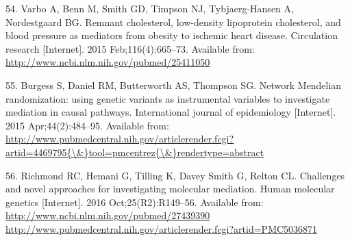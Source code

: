 \documentclass[]{article}
\begin{document}
\hypertarget{ref-Varbo2015}{}
54. Varbo A, Benn M, Smith GD, Timpson NJ, Tybjaerg-Hansen A,
Nordestgaard BG. Remnant cholesterol, low-density lipoprotein
cholesterol, and blood pressure as mediators from obesity to ischemic
heart disease. Circulation research {[}Internet{]}. 2015
Feb;116(4):665--73. Available from:
\url{http://www.ncbi.nlm.nih.gov/pubmed/25411050}

\hypertarget{ref-Burgess2015}{}
55. Burgess S, Daniel RM, Butterworth AS, Thompson SG. Network Mendelian
randomization: using genetic variants as instrumental variables to
investigate mediation in causal pathways. International journal of
epidemiology {[}Internet{]}. 2015 Apr;44(2):484--95. Available from:
\href{http://www.pubmedcentral.nih.gov/articlerender.fcgi?artid=4469795\%7B/\&\%7Dtool=pmcentrez\%7B/\&\%7Drendertype=abstract}{http://www.pubmedcentral.nih.gov/articlerender.fcgi?artid=4469795\{\textbackslash{}\&\}tool=pmcentrez\{\textbackslash{}\&\}rendertype=abstract}

\hypertarget{ref-Richmond2016}{}
56. Richmond RC, Hemani G, Tilling K, Davey Smith G, Relton CL.
Challenges and novel approaches for investigating molecular mediation.
Human molecular genetics {[}Internet{]}. 2016 Oct;25(R2):R149--56.
Available from:
\href{http://www.ncbi.nlm.nih.gov/pubmed/27439390\%20http://www.pubmedcentral.nih.gov/articlerender.fcgi?artid=PMC5036871}{http://www.ncbi.nlm.nih.gov/pubmed/27439390 http://www.pubmedcentral.nih.gov/articlerender.fcgi?artid=PMC5036871}
\end{document}
